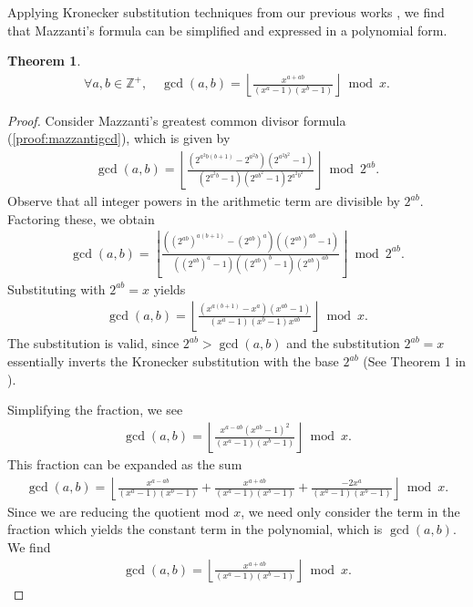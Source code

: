 \documentclass[11pt,reqno]{article}
\theoremstyle{plain}
\newtheorem{theorem}{Theorem}
\theoremstyle{definition}
\newcommand{\floor}[1]{\left\lfloor #1 \right\rfloor}
\newcommand{\Z}{\mathbb{Z}}
\begin{document}
Applying Kronecker substitution techniques from our previous works \cite{shunia2023simple, shunia2024polynomial}, we find that Mazzanti's formula can be simplified and expressed in a polynomial form.

\begin{theorem} \label{proof:gcdpolynomial}
\begin{align*}
\forall a,b \in \Z^+, \quad
\gcd(a,b) = \floor{\frac{x^{a+ab}}{(x^a - 1)(x^b-1)}}\bmod x .
\end{align*}
\end{theorem}
\begin{proof}
Consider Mazzanti's greatest common divisor formula (\cref{proof:mazzantigcd}), which is given by
\begin{align*}
\gcd(a,b) = \floor{\frac{(2^{a^2 b(b+1)} - 2^{a^2 b}) (2^{a^2 b^2} - 1)}
         {(2^{a^2 b} - 1)(2^{ab^2}-1)2^{a^2 b^2}}} \bmod 2^{ab}.
\end{align*}
Observe that all integer powers in the arithmetic term are divisible by $2^{ab}$. Factoring these, we obtain
\begin{align*}
\gcd(a,b) = \floor{\frac{((2^{ab})^{a (b+1)} - (2^{ab})^a) ((2^{ab})^{ab} - 1)}
 {((2^{ab})^{a} - 1)((2^{ab})^{b}-1) (2^{ab})^{ab}}} \bmod 2^{ab} .
\end{align*}
Substituting with $2^{ab} = x$ yields
\begin{align*}
\gcd(a,b) = \floor{\frac{(x^{a (b+1)} - x^a) (x^{ab} - 1)}
 {(x^{a} - 1)(x^{b}-1) x^{ab}}} \bmod x .
\end{align*}
The substitution is valid, since $2^{ab} > \gcd(a,b)$ and the substitution $2^{ab} = x$ essentially inverts the Kronecker substitution with the base $2^{ab}$ (See Theorem 1 in \cite{shunia2023simple}).

Simplifying the fraction, we see
\begin{align*}
\gcd(a,b) = \floor{
\frac
{ x^{a-ab} (x^{ab} - 1)^2 }
{ (x^a - 1)(x^b-1) }
}
 \bmod x .
\end{align*}
This fraction can be expanded as the sum
\begin{align*}
\gcd(a,b) = \floor{
    \frac
    { x^{a-ab} }
    { (x^a - 1)(x^b-1) }
    +
    \frac
    { x^{a+ab} }
    { (x^a - 1)(x^b-1) }
    +
    \frac
    { -2x^{a} }
    { (x^a - 1)(x^b-1) }
}
 \bmod x .
\end{align*}
Since we are reducing the quotient mod $x$, we need only consider the term in the fraction which yields the constant term in the polynomial, which is $\gcd(a,b)$. We find
\begin{align*}
\gcd(a,b) = \floor{\frac{x^{a+ab}}{(x^a-1)(x^b-1)}}\bmod x .
\end{align*}
\end{proof}
\end{document}

